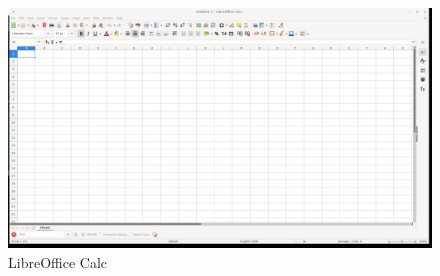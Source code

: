 \begin{figure}[h!]		
	\centering
   	\includegraphics[width=8.0in]{pictures/picture_003.png}
  	\caption{LibreOffice Calc}
   	\label{fig:LibreOfficeCalc003}
\end{figure}